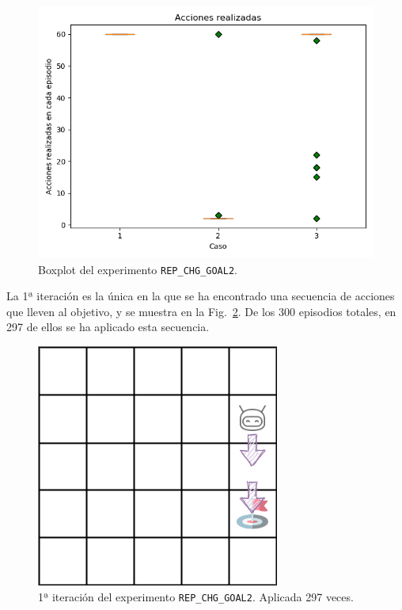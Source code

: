 \begin{figure}
    \centering
    \includegraphics[scale=0.4]{cap5_experimentacion/images/CHANGE_GOAL-20_09-21_35-1, 0, 2_boxplot.png}
    \caption{Boxplot del experimento \texttt{REP\_CHG\_GOAL2}.}
    \label{fig:CHANGE_GOAL-20_09-21_35-1, 0, 2_boxplot}
\end{figure}

La 1ª iteración es la única en la que se ha encontrado una secuencia de acciones que lleven al objetivo, y se muestra en la Fig.~\ref{fig:CHANGE_GOAL-20_09-21_30-0, 2, 1_it1_297}. De los 300 episodios totales, en 297 de ellos se ha aplicado esta secuencia. \\

\begin{figure}
    \centering
    \includegraphics[scale=0.4]{cap5_experimentacion/images/CHANGE_GOAL-20_09-21_30-0, 2, 1_it1_290.png}
    \caption{1ª iteración del experimento \texttt{REP\_CHG\_GOAL2}. Aplicada 297 veces.}
    \label{fig:CHANGE_GOAL-20_09-21_30-0, 2, 1_it1_297}
\end{figure}

